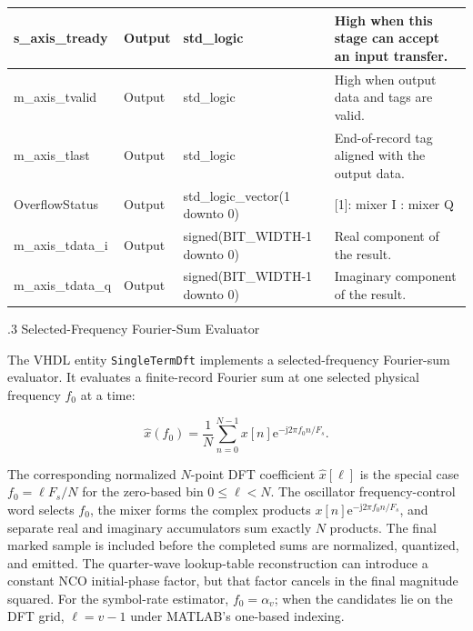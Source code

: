 \begin{table}[H]
\begin{center}
\begin{tabularx}{\textwidth}{|L{0.24\textwidth}|L{0.13\textwidth}|L{0.28\textwidth}|Y|}
\hline
s\_axis\_tready    & Output & std\_logic & High when this stage can accept an input transfer. \\
\hline
m\_axis\_tvalid    & Output & std\_logic & High when output data and tags are valid. \\
\hline
m\_axis\_tlast     & Output & std\_logic & End-of-record tag aligned with the output data. \\
\hline
OverflowStatus     & Output & std\_logic\_vector(1 \newline downto 0) & [1]: mixer I \newline [0]: mixer Q \\
\hline
m\_axis\_tdata\_i  & Output & signed(BIT\_WIDTH-1 \newline downto 0) & Real component of the result. \\
\hline
m\_axis\_tdata\_q  & Output & signed(BIT\_WIDTH-1 \newline downto 0) & Imaginary component of the result. \\
\hline
\end{tabularx}
\end{center}
\end{table}

%
%
\bigskip
{}
.3  \quad Selected-Frequency Fourier-Sum Evaluator

The VHDL entity \texttt{SingleTermDft} implements a selected-frequency Fourier-sum evaluator.  It evaluates a finite-record Fourier sum at one selected physical frequency $f_0$ at a time:

\begin{equation*}
\widehat{x}(f_0)=\frac{1}{N}\sum_{n=0}^{N-1}x[n]\mathrm{e}^{-\mathrm{j}2\pi f_0n/F_s}.
\end{equation*}
	
The corresponding normalized $N$-point DFT coefficient $\widehat{x}[\ell]$ is the special case $f_0=\ell F_s/N$ for the zero-based bin $0\leq\ell<N$.  The oscillator frequency-control word selects $f_0$, the mixer forms the complex products $x[n]\mathrm{e}^{-\mathrm{j}2\pi f_0n/F_s}$, and separate real and imaginary accumulators sum exactly $N$ products.  The final marked sample is included before the completed sums are normalized, quantized, and emitted.  The quarter-wave lookup-table reconstruction can introduce a constant NCO initial-phase factor, but that factor cancels in the final magnitude squared.  For the symbol-rate estimator, $f_0=\alpha_v$; when the candidates lie on the DFT grid, $\ell=v-1$ under MATLAB's one-based indexing.

